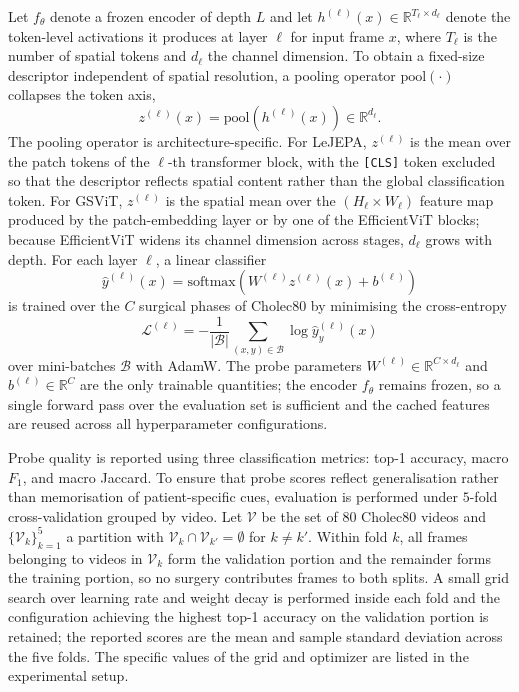 \documentclass[11pt, a4paper]{article}
\begin{document}
Let $f_\theta$ denote a frozen encoder of depth $L$ and let $h^{(\ell)}(x) \in \mathbb{R}^{T_\ell \times d_\ell}$ denote the token-level activations it produces at layer $\ell$ for input frame $x$, where $T_\ell$ is the number of spatial tokens and $d_\ell$ the channel dimension. To obtain a fixed-size descriptor independent of spatial resolution, a pooling operator $\mathrm{pool}(\cdot)$ collapses the token axis,
\begin{equation}
z^{(\ell)}(x) = \mathrm{pool}\!\left(h^{(\ell)}(x)\right) \in \mathbb{R}^{d_\ell}.
\end{equation}
The pooling operator is architecture-specific. For LeJEPA, $z^{(\ell)}$ is the mean over the patch tokens of the $\ell$-th transformer block, with the \texttt{[CLS]} token excluded so that the descriptor reflects spatial content rather than the global classification token. For GSViT, $z^{(\ell)}$ is the spatial mean over the $(H_\ell \times W_\ell)$ feature map produced by the patch-embedding layer or by one of the EfficientViT blocks; because EfficientViT widens its channel dimension across stages, $d_\ell$ grows with depth. For each layer $\ell$, a linear classifier
\begin{equation}
\hat{y}^{(\ell)}(x) = \mathrm{softmax}\!\left(W^{(\ell)} z^{(\ell)}(x) + b^{(\ell)}\right)
\end{equation}
is trained over the $C$ surgical phases of Cholec80 by minimising the cross-entropy
\begin{equation}
\mathcal{L}^{(\ell)} = -\frac{1}{|\mathcal{B}|}\sum_{(x, y) \in \mathcal{B}} \log \hat{y}^{(\ell)}_y(x)
\end{equation}
over mini-batches $\mathcal{B}$ with AdamW. The probe parameters $W^{(\ell)} \in \mathbb{R}^{C \times d_\ell}$ and $b^{(\ell)} \in \mathbb{R}^{C}$ are the only trainable quantities; the encoder $f_\theta$ remains frozen, so a single forward pass over the evaluation set is sufficient and the cached features are reused across all hyperparameter configurations.

Probe quality is reported using three classification metrics: top-1 accuracy, macro $F_1$, and macro Jaccard. To ensure that probe scores reflect generalisation rather than memorisation of patient-specific cues, evaluation is performed under $5$-fold cross-validation grouped by video. Let $\mathcal{V}$ be the set of $80$ Cholec80 videos and $\{\mathcal{V}_k\}_{k=1}^{5}$ a partition with $\mathcal{V}_k \cap \mathcal{V}_{k'} = \emptyset$ for $k \neq k'$. Within fold $k$, all frames belonging to videos in $\mathcal{V}_k$ form the validation portion and the remainder forms the training portion, so no surgery contributes frames to both splits. A small grid search over learning rate and weight decay is performed inside each fold and the configuration achieving the highest top-1 accuracy on the validation portion is retained; the reported scores are the mean and sample standard deviation across the five folds. The specific values of the grid and optimizer are listed in the experimental setup.
\end{document}
